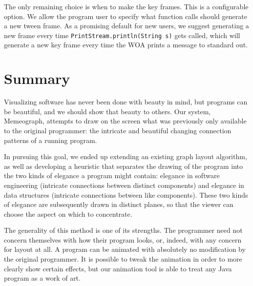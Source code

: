 \documentclass[11pt]{article}
\begin{document}
The only remaining choice is when to make the key frames.  This is a
configurable option.  We allow the program user to specify what function calls
should generate a new tween frame.  As a promising default for new users, we
suggest generating a new frame every time {\tt PrintStream.println(String s)}
gets called, which will generate a new key frame every time the WOA prints a
message to standard out.

\section{Summary}

Visualizing software has never been done with beauty in mind, but programs can
be beautiful, and we should show that beauty to others.  Our system,
Memeograph\nocite{memeograph}, attempts to draw on the screen what was
previously only available to the original programmer: the intricate and
beautiful changing connection patterns of a running program.

In pursuing this goal, we ended up extending an existing graph layout
algorithm, as well as developing a heuristic that separates the drawing of the
program into the two kinds of elegance a program might contain: elegance in
software engineering (intricate connections between distinct components) and
elegance in data structures (intricate connections between like components).
These two kinds of elegance are subsequently drawn in distinct planes, so that
the viewer can choose the aspect on which to concentrate.

The generality of this method is one of its strengths.  The programmer need not
concern themselves with how their program looks, or, indeed, with any concern
for layout at all.  A program can be animated with absolutely no modification
by the original programmer.  It is possible to tweak the animation in order to
more clearly show certain effects, but our animation tool is able to treat any
Java program as a work of art.

\setlength{\baselineskip}{13pt} 

\end{document}
